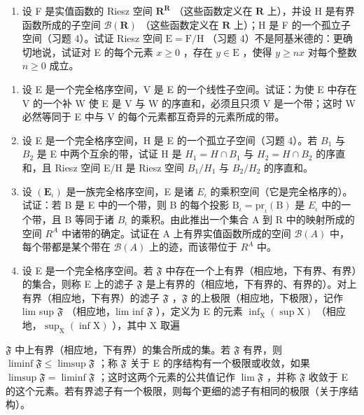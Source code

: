 \begin{enumerate}
\def\labelenumi{\alph{enumi})}
\setcounter{enumi}{1}
\tightlist
\item
  设 F 是实值函数的 Riesz 空间 \(\mathbf{R}^{\mathbf{R}}\) （这些函数定义在 \(\mathbf{R}\) 上），并设 H 是有界函数所成的子空间 \(\mathcal{B}(\mathbf{R})\) （这些函数定义在 \(\mathbf{R}\) 上）；H 是 F 的一个孤立子空间（习题 4）。试证 Riesz 空间 \(\mathrm{E} = \mathrm{F} / \mathrm{H}\) （习题 4）不是阿基米德的：更确切地说，试证对 E 的每个元素 \(x \geqslant 0\) ，存在 \(y \in \mathrm{E}\) ，使得 \(y \geqslant nx\) 对每个整数 \(n \geqslant 0\) 成立。
\end{enumerate}

\begin{enumerate}
\def\labelenumi{\arabic{enumi})}
\setcounter{enumi}{5}
\item
  设 E 是一个完全格序空间，V 是 E 的一个线性子空间。试证：为使 E 中存在 V 的一个补 W 使 E 是 V 与 W 的序直和，必须且只须 V 是一个带；这时 W 必然等同于 E 中与 V 的每个元素都互奇异的元素所成的带。
\item
  设 E 是一个完全格序空间，H 是 E 的一个孤立子空间（习题 4）。若 \(B_{1}\) 与 \(B_{2}\) 是 E 中两个互余的带，试证 H 是 \(H_{1}=H\cap B_{1}\) 与 \(H_{2}=H\cap B_{2}\) 的序直和，且 Riesz 空间 E/H 是 Riesz 空间 \(B_{1}/H_{1}\) 与 \(B_{2}/H_{2}\) 的序直和。
\item
  设 \((\mathbf{E}_{\iota})\) 是一族完全格序空间，E 是诸 \(E_{\iota}\) 的乘积空间（它是完全格序的）。试证：若 B 是 E 中的一个带，则 B 的每个投影 \(\mathrm{B}_{\iota} = \mathrm{pr}_{\iota}(\mathrm{B})\) 是 \(E_{\iota}\) 中的一个带，且 B 等同于诸 \(B_{\iota}\) 的乘积。由此推出一个集合 A 到 R 中的映射所成的空间 \(R^{A}\) 中诸带的确定。试证在 A 上有界实值函数所成的空间 \(\mathcal{B}(A)\) 中，每个带都是某个带在 \(\mathcal{B}(A)\) 上的迹，而该带位于 \(R^{A}\) 中。
\item
  设 E 是一个完全格序空间。若 \(\mathfrak{F}\) 中存在一个上有界（相应地，下有界、有界）的集合，则称 E 上的滤子 \(\mathfrak{F}\) 是上有界的（相应地，下有界的、有界的）。对上有界（相应地，下有界）的滤子 \(\mathfrak{F}\) ，\(\mathfrak{F}\) 的上极限（相应地，下极限），记作 lim sup \(\mathfrak{F}\) （相应地，lim inf \(\mathfrak{F}\) ），定义为 E 的元素 \(\inf_{\mathrm{X}}(\sup \mathrm{X})\) （相应地，\(\sup_{\mathrm{X}}(\inf \mathrm{X})\) ），其中 X 取遍
\end{enumerate}

\(\mathfrak{F}\) 中上有界（相应地，下有界）的集合所成的集。若 \(\mathfrak{F}\) 有界，则 \(\liminf\mathfrak{F} \leqslant \limsup\mathfrak{F}\) ；称 \(\mathfrak{F}\) 关于 E 的序结构有一个极限或收敛，如果 \(\limsup\mathfrak{F} = \liminf\mathfrak{F}\) ；这时这两个元素的公共值记作 \(\lim\mathfrak{F}\) ，并称 \(\mathfrak{F}\) 收敛于 E 的这个元素。若有界滤子有一个极限，则每个更细的滤子有相同的极限（关于序结构）。

